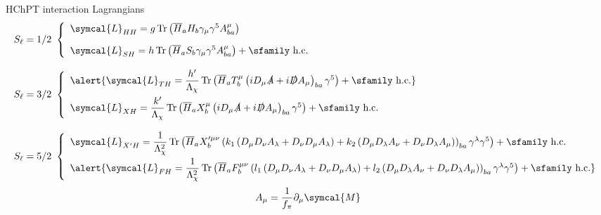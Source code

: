 \documentclass[professionalfonts,aspectratio=169]{beamer}
\newcommand{\adj}[1]{\overline{#1}}
\DeclareMathOperator{\tr}{Tr}
\begin{document}
\begin{frame}{HChPT interaction Lagrangians}
  \scriptsize
  \begin{equation*}
    \begin{array}{l}
      S_\ell = 1/2 \ \left\{
        \begin{array}{l}
          \symcal{L}_{HH} = g \tr{\left(\adj{H}_a H_b \gamma_\mu \gamma^5 A_{ba}^\mu \right)} \\[10pt]
          \symcal{L}_{SH} = h \tr{\left(\adj{H}_a S_b \gamma_\mu \gamma^5 A_{ba}^\mu \right)} + \text{\sfamily h.c.}
        \end{array} \right. \\ \\
      S_\ell = 3/2 \ \left\{
        \begin{array}{l}
          \alert{\symcal{L}_{TH} =  \dfrac{h'}{\Lambda_\chi} \tr{\left(\adj{H}_a T^\mu_b \left( i D_\mu \slashed{A} + i \slashed{D} A_\mu \right)_{ba} \gamma^5 \right)} + \text{\sfamily h.c.}} \\[10pt]
          \symcal{L}_{XH} = \dfrac{k'}{\Lambda_\chi} \tr{\left( \adj{H}_a X^\mu_b \left( i D_\mu \slashed{A} + i \slashed{D} A_\mu \right)_{ba} \gamma^5 \right)} + \text{\sfamily h.c.}
        \end{array} \right. \\ \\
      S_\ell = 5/2 \ \left\{
        \begin{array}{l}
          \symcal{L}_{X'H} =  \dfrac{1}{\Lambda_\chi^2} \tr \left( \adj{H}_a X^{\prime \mu \nu}_b \left( k_1 \left( D_\mu D_\nu A_\lambda + D_\nu D_\mu A_\lambda \right) + k_2 \left( D_\mu D_\lambda A_\nu + D_\nu D_\lambda A_\mu \right) \right)_{ba}  \gamma^\lambda \gamma^5 \right) + \text{\sfamily h.c.} \\[10pt]
          \alert{\symcal{L}_{FH} =  \dfrac{1}{\Lambda_\chi^2} \tr \left( \adj{H}_a F^{\mu \nu}_b \left( l_1 \left( D_\mu D_\nu A_\lambda + D_\nu D_\mu A_\lambda \right) + l_2 \left( D_\mu D_\lambda A_\nu + D_\nu D_\lambda A_\mu \right) \right)_{ba}  \gamma^\lambda \gamma^5 \right) + \text{\sfamily h.c.}}
        \end{array} \right.
    \end{array}
  \end{equation*}
  \begin{equation*}
    A_\mu = \frac{1}{f_\pi} \partial_\mu \symcal{M}
  \end{equation*}
\end{frame}
\end{document}
